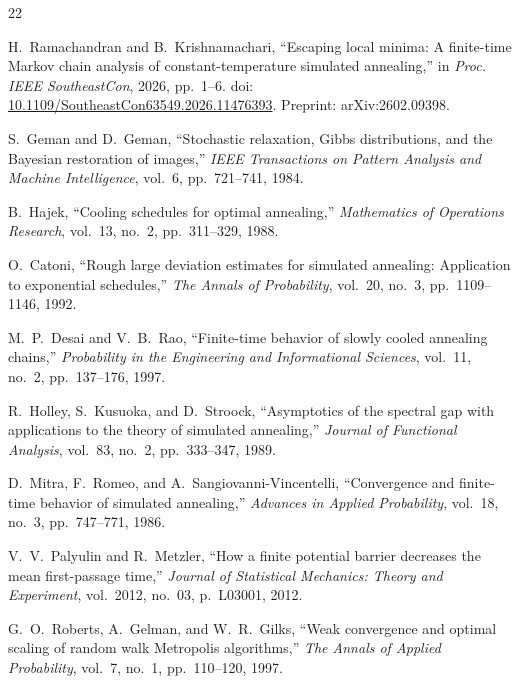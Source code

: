 \documentclass[conference]{IEEEtran}
\begin{document}
\begin{thebibliography}{22}

H.~Ramachandran and B.~Krishnamachari,
``Escaping local minima: A finite-time {M}arkov chain analysis of
constant-temperature simulated annealing,''
in \emph{Proc. IEEE SoutheastCon}, 2026, pp.~1--6.
doi: \url{10.1109/SoutheastCon63549.2026.11476393}.
Preprint: arXiv:2602.09398.

S.~Geman and D.~Geman,
``Stochastic relaxation, {G}ibbs distributions, and the {B}ayesian
restoration of images,''
\emph{IEEE Transactions on Pattern Analysis and Machine Intelligence},
vol.~6, pp.~721--741, 1984.

B.~Hajek,
``Cooling schedules for optimal annealing,''
\emph{Mathematics of Operations Research},
vol.~13, no.~2, pp.~311--329, 1988.

O.~Catoni,
``Rough large deviation estimates for simulated annealing:
Application to exponential schedules,''
\emph{The Annals of Probability},
vol.~20, no.~3, pp.~1109--1146, 1992.

M.~P.~Desai and V.~B.~Rao,
``Finite-time behavior of slowly cooled annealing chains,''
\emph{Probability in the Engineering and Informational Sciences},
vol.~11, no.~2, pp.~137--176, 1997.

R.~Holley, S.~Kusuoka, and D.~Stroock,
``Asymptotics of the spectral gap with applications to the theory of
simulated annealing,''
\emph{Journal of Functional Analysis},
vol.~83, no.~2, pp.~333--347, 1989.

D.~Mitra, F.~Romeo, and A.~Sangiovanni-Vincentelli,
``Convergence and finite-time behavior of simulated annealing,''
\emph{Advances in Applied Probability},
vol.~18, no.~3, pp.~747--771, 1986.

V.~V.~Palyulin and R.~Metzler,
``How a finite potential barrier decreases the mean first-passage time,''
\emph{Journal of Statistical Mechanics: Theory and Experiment},
vol.~2012, no.~03, p.~L03001, 2012.

G.~O.~Roberts, A.~Gelman, and W.~R.~Gilks,
``Weak convergence and optimal scaling of random walk {M}etropolis
algorithms,''
\emph{The Annals of Applied Probability},
vol.~7, no.~1, pp.~110--120, 1997.


\end{thebibliography}
\end{document}
